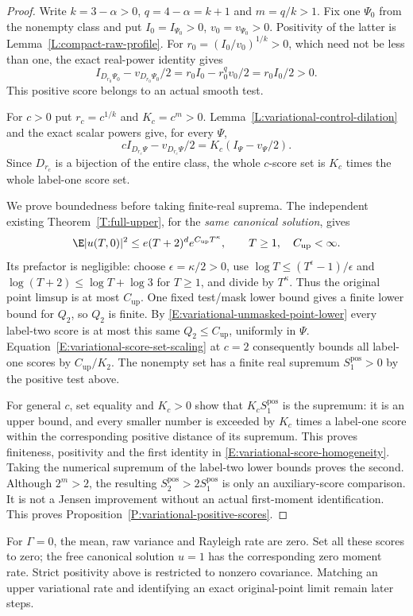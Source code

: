 \begin{proof}
  Write $k=3-\alpha>0$, $q=4-\alpha=k+1$ and $m=q/k>1$.
  Fix one $\Psi_0$ from the nonempty class and put
  $I_0=I_{\Psi_0}>0$, $v_0=v_{\Psi_0}>0$.
  Positivity of the latter is Lemma~\ref{L:compact-raw-profile}.
  For $r_0=(I_0/v_0)^{1/k}>0$, which need not be less than one,
  the exact real-power identity gives
  \[
    I_{D_{r_0}\Psi_0}-v_{D_{r_0}\Psi_0}/2
    =r_0I_0-r_0^qv_0/2=r_0I_0/2>0.
  \]
  This positive score belongs to an actual smooth test.

  For $c>0$ put $r_c=c^{1/k}$ and $K_c=c^m>0$.
  Lemma~\ref{L:variational-control-dilation} and the exact scalar
  powers give, for every $\Psi$,
  \begin{equation}\label{E:variational-score-set-scaling}
    cI_{D_{r_c}\Psi}-v_{D_{r_c}\Psi}/2
    =K_c(I_\Psi-v_\Psi/2).
  \end{equation}
  Since $D_{r_c}$ is a bijection of the entire class, the whole
  $c$-score set is $K_c$ times the whole label-one score set.

  We prove boundedness before taking finite-real suprema.
  The independent existing Theorem~\ref{T:full-upper}, for the
  \emph{same canonical solution}, gives
  \[
    \E|u(T,0)|^2\le e(T+2)^d e^{C_{\mathrm{up}}T^\kappa},
    \qquad T\ge1,\quad C_{\mathrm{up}}<\infty.
  \]
  Its prefactor is negligible: choose $\epsilon=\kappa/2>0$,
  use $\log T\le(T^\epsilon-1)/\epsilon$ and
  $\log(T+2)\le\log T+\log3$ for $T\ge1$, and divide by $T^\kappa$.
  Thus the original point limsup is at most $C_{\mathrm{up}}$.
  One fixed test/mask lower bound gives a finite lower bound for
  $Q_2$, so $Q_2$ is finite. By
  \eqref{E:variational-unmasked-point-lower} every label-two score
  is at most this same $Q_2\le C_{\mathrm{up}}$, uniformly in $\Psi$.
  Equation~\eqref{E:variational-score-set-scaling} at $c=2$
  consequently bounds all label-one scores by $C_{\mathrm{up}}/K_2$.
  The nonempty set has a finite real supremum
  $S_1^{\mathrm{pos}}>0$ by the positive test above.

  For general $c$, set equality and $K_c>0$ show that
  $K_cS_1^{\mathrm{pos}}$ is the supremum: it is an upper bound,
  and every smaller number is exceeded by $K_c$ times a label-one
  score within the corresponding positive distance of its supremum.
  This proves finiteness, positivity and the first identity in
  \eqref{E:variational-score-homogeneity}. Taking the numerical
  supremum of the label-two lower bounds proves the second.
  Although $2^m>2$, the resulting $S_2^{\mathrm{pos}}>2S_1^{\mathrm{pos}}$
  is only an auxiliary-score comparison. It is not a Jensen
  improvement without an actual first-moment identification.
  This proves Proposition~\ref{P:variational-positive-scores}.
\end{proof}

For $\Gamma=0$, the mean, raw variance and Rayleigh rate are zero.
Set all these scores to zero; the free canonical solution $u=1$
has the corresponding zero moment rate. Strict positivity above is
restricted to nonzero covariance. Matching an upper variational rate
and identifying an exact original-point limit remain later steps.
